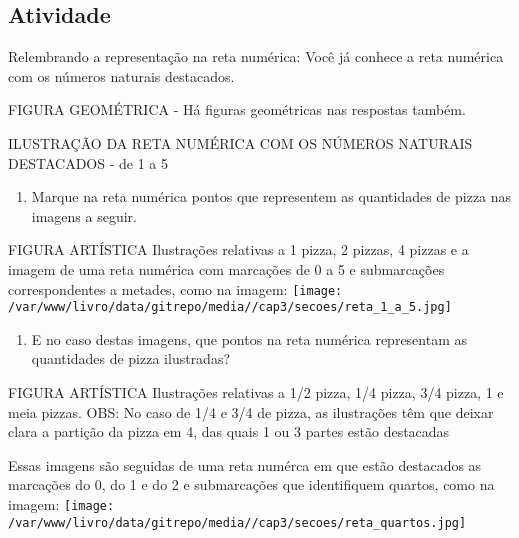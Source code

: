 \documentclass[a4,12pt]{book}
\begin{document}
\subsection{Atividade}

Relembrando a representação na reta numérica: Você já conhece a reta numérica com os números naturais destacados.

\begin{imagem*}[breakable]{}{}   FIGURA GEOMÉTRICA - Há figuras geométricas nas respostas também.  
  
  ILUSTRAÇÃO DA RETA NUMÉRICA COM OS NÚMEROS NATURAIS DESTACADOS - de 1 a 5  
\end{imagem*}

\begin{enumerate} [\quad a)] %
  \item     Marque na reta numérica pontos que representem as quantidades de pizza nas imagens a seguir. 
\end{enumerate} %


\mbox{} \newline  \begin{imagem*}[breakable]{}{}   FIGURA ARTÍSTICA   \mbox{} \newline    Ilustrações relativas a 1 pizza, 2 pizzas, 4 pizzas  e a imagem de uma reta numérica com marcações de 0 a 5 e submarcações correspondentes a metades, como na imagem:     \texttt{[image: /var/www/livro/data/gitrepo/media//cap3/secoes/reta\_1\_a\_5.jpg]}  
  
\end{imagem*}


\begin{enumerate} [\quad a)] %
  \item     E no caso destas imagens, que pontos na reta numérica representam as quantidades de pizza ilustradas?
\end{enumerate} %


\mbox{} \newline  \begin{imagem*}[breakable]{}{}   FIGURA ARTÍSTICA   \mbox{} \newline    Ilustrações relativas a 1/2 pizza,  1/4 pizza, 3/4 pizza, 1 e meia pizzas. OBS: No caso de 1/4 e 3/4 de pizza, as ilustrações têm que deixar clara a partição da pizza em 4, das quais 1 ou 3 partes estão destacadas   
  
  Essas imagens são seguidas de uma reta numérca em que estão destacados as marcações do 0, do 1 e do 2 e submarcações que identifiquem quartos, como na imagem:     \texttt{[image: /var/www/livro/data/gitrepo/media//cap3/secoes/reta\_quartos.jpg]}   \end{imagem*}
\end{document}

